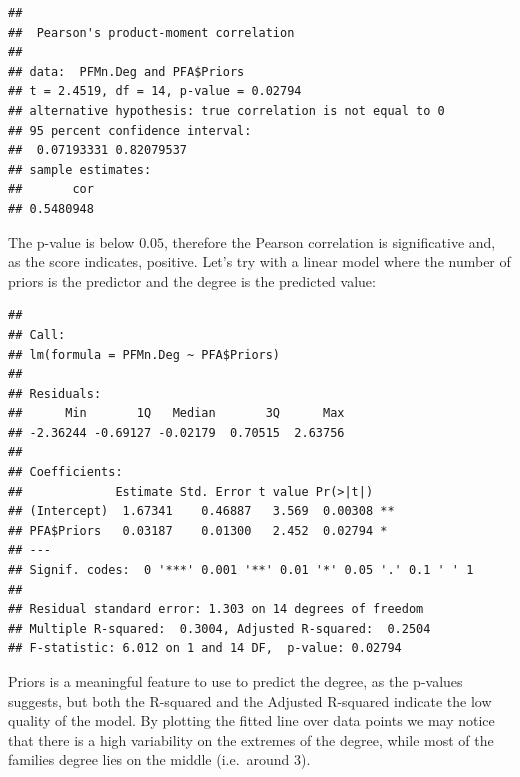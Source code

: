 \documentclass[
  notitlepage,
  onecolumn,
  openany]{book}
\newenvironment{Shaded}{\begin{snugshade}}{\end{snugshade}}
\newcommand{\CommentTok}[1]{\textcolor[rgb]{0.56,0.35,0.01}{\textit{#1}}}
\newcommand{\DocumentationTok}[1]{\textcolor[rgb]{0.56,0.35,0.01}{\textbf{\textit{#1}}}}
\newcommand{\FunctionTok}[1]{\textcolor[rgb]{0.00,0.00,0.00}{#1}}
\newcommand{\NormalTok}[1]{#1}
\newcommand{\OtherTok}[1]{\textcolor[rgb]{0.56,0.35,0.01}{#1}}
\newcommand{\SpecialCharTok}[1]{\textcolor[rgb]{0.00,0.00,0.00}{#1}}
\begin{document}
\begin{Shaded}
\end{Shaded}

\begin{verbatim}
## 
##  Pearson's product-moment correlation
## 
## data:  PFMn.Deg and PFA$Priors
## t = 2.4519, df = 14, p-value = 0.02794
## alternative hypothesis: true correlation is not equal to 0
## 95 percent confidence interval:
##  0.07193331 0.82079537
## sample estimates:
##       cor 
## 0.5480948
\end{verbatim}

The p-value is below \(0.05\), therefore the Pearson correlation is significative and, as the score indicates, positive. Let's try with a linear model where the number of priors is the predictor and the degree is the predicted value:

\begin{Shaded}
\end{Shaded}

\begin{verbatim}
## 
## Call:
## lm(formula = PFMn.Deg ~ PFA$Priors)
## 
## Residuals:
##      Min       1Q   Median       3Q      Max 
## -2.36244 -0.69127 -0.02179  0.70515  2.63756 
## 
## Coefficients:
##             Estimate Std. Error t value Pr(>|t|)   
## (Intercept)  1.67341    0.46887   3.569  0.00308 **
## PFA$Priors   0.03187    0.01300   2.452  0.02794 * 
## ---
## Signif. codes:  0 '***' 0.001 '**' 0.01 '*' 0.05 '.' 0.1 ' ' 1
## 
## Residual standard error: 1.303 on 14 degrees of freedom
## Multiple R-squared:  0.3004, Adjusted R-squared:  0.2504 
## F-statistic: 6.012 on 1 and 14 DF,  p-value: 0.02794
\end{verbatim}

Priors is a meaningful feature to use to predict the degree, as the p-values suggests, but both the R-squared and the Adjusted R-squared indicate the low quality of the model. By plotting the fitted line over data points we may notice that there is a high variability on the extremes of the degree, while most of the families degree lies on the middle (i.e.~around 3).
\end{document}

